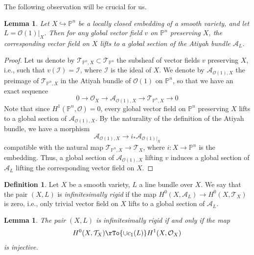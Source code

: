 \documentclass[reqno]{amsart}
\newtheorem{lemma}[theorem]{Lemma}
\theoremstyle{definition}
\newtheorem{definition}[theorem]{Definition}
\theoremstyle{remark}
\newcommand{\hra}{\hookrightarrow}
\renewcommand{\P}{{\mathbb P}}
\newcommand{\OO}{{\mathcal O}}
\newcommand{\sub}{\subset}
\newcommand{\cA}{\mathcal{A}}
\newcommand{\cT}{\mathcal{T}}
\newcommand{\cO}{\mathcal{O}}
\newcommand{\cI}{\mathcal{I}}
\numberwithin{equation}{section}
\begin{document}
The following observation will be crucial for us.

\begin{lemma}\label{At-vec-field-lem} 
Let $X\hra \P^n$ be a locally closed embedding of a smooth variety, and 
let $L=\cO(1)|_X$. Then for any global vector field $v$ on $\P^n$ preserving $X$,
the corresponding vector field on $X$ 
lifts to a global section of the Atiyah bundle $\cA_L$.
\end{lemma}

\begin{proof}
Let us 
denote by $\cT_{\P^n,X}\sub \cT_{\P^n}$  
the subsheaf of vector fields $v$ preserving $X$, i.e., such that $v(\cI)=\cI$, where $\cI$ is the ideal of $X$.
We denote by $\cA_{\cO(1),X}$ the preimage of $\cT_{\P^n,X}$ in the Atiyah bundle of $\cO(1)$ on $\P^n$, so that we have an exact sequence
$$0\to \OO_X\to \cA_{\cO(1),X}\to \cT_{\P^n,X}\to 0$$
Note that since $H^1(\P^n,\OO)=0$, every global vector field on $\P^n$ preserving $X$ lifts to a global section of $\cA_{\cO(1),X}$.
By the naturality of the definition of the Atiyah bundle, we have a morphism 
$$\cA_{\cO(1),X}\to i_*\cA_{\cO(1)|_X}$$
compatible with the natural map $\cT_{\P^n,X}\to \cT_X$, where $i:X\to \P^n$ is the embedding.
Thus, a global section of $\cA_{\cO(1),X}$ lifting $v$ induces a global section of $\cA_L$ lifting the corresponding vector field on $X$.
\end{proof}

\begin{definition} Let $X$ be a smooth variety, $L$ a line bundle over $X$. We say that the pair $(X,L)$ is {\it infinitesimally rigid} if the map
$H^0(X,\cA_L)\to H^0(X,\cT_X)$ is zero, i.e., only trivial vector field on $X$ lifts to a global section of $\cA_L$.
\end{definition}

\begin{lemma}\label{inf-rigid-lem}
The pair $(X,L)$ is infinitesimally rigid if and only if the map
\begin{equation}\label{c1-map-eq}
H^0(X,\cT_X)\rTo{\cup c_1(L)} H^1(X,\cO_X)
\end{equation}
is injective. 
\end{lemma}
\end{document}
